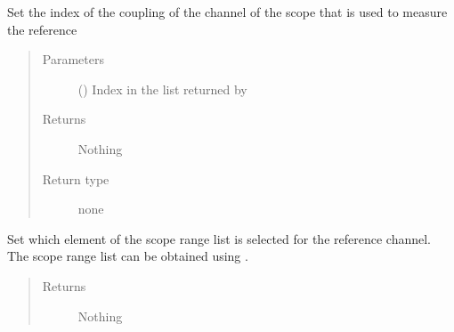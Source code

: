 \documentclass[letterpaper,10pt,english]{sphinxmanual}
\begin{document}
\begin{fulllineitems}
\begin{fulllineitems}
\label{\detokenize{index:TiePieLCR_settings.TiePieLCR_settings.set_reference_scope_coupling}}
\sphinxAtStartPar
Set the index of the coupling of the channel of the scope that is used to measure the reference
\begin{quote}\begin{description}
\item[{Parameters}] \leavevmode
\sphinxAtStartPar
{} () \textendash{} Index in the list returned by {\hyperref[\detokenize{index:TiePieLCR_settings.TiePieLCR_settings.get_scope_coupling_name_list}]{}}

\item[{Returns}] \leavevmode
\sphinxAtStartPar
Nothing

\item[{Return type}] \leavevmode
\sphinxAtStartPar
none

\end{description}\end{quote}

\end{fulllineitems}


\begin{fulllineitems}
\label{\detokenize{index:TiePieLCR_settings.TiePieLCR_settings.set_reference_scope_range}}
\sphinxAtStartPar
Set which element of the scope range list is selected for the reference channel. The scope range list can be obtained using {\hyperref[\detokenize{index:TiePieLCR_settings.TiePieLCR_settings.get_scope_range_list}]{}}.
\begin{quote}\begin{description}
\item[{Returns}] \leavevmode
\sphinxAtStartPar
Nothing


\end{description}
\end{quote}
\end{fulllineitems}
\end{fulllineitems}
\end{document}
